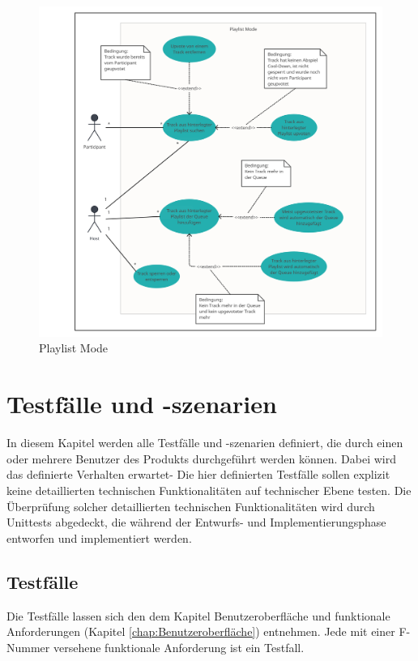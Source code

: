 \documentclass[oneside, ngerman]{sdqtechreport}
\begin{document}
\begin{figure}[h]
    \includegraphics[width = 16cm]{LATEX/Pflichtenheft/GraphicDesigns/Use Case Playlist Mode.png}
    \caption{Playlist Mode}
    \label{fig:Use Case Playlist Mode}
\end{figure}



\chapter{Testfälle und -szenarien}
\label{chap:Tests}

In diesem Kapitel werden alle Testfälle und -szenarien definiert, die durch einen oder mehrere Benutzer des Produkts durchgeführt werden können. Dabei wird das definierte Verhalten erwartet- Die hier definierten Testfälle sollen explizit keine detaillierten technischen Funktionalitäten auf technischer Ebene testen. Die Überprüfung solcher detaillierten technischen Funktionalitäten wird durch Unittests abgedeckt, die während der Entwurfs- und Implementierungsphase entworfen und implementiert werden.

\section{Testfälle}
\label{sec:Tests:Testfälle}

Die Testfälle lassen sich den dem Kapitel Benutzeroberfläche und funktionale Anforderungen (Kapitel \ref{chap:Benutzeroberfläche}) entnehmen. Jede mit einer F-Nummer versehene funktionale Anforderung ist ein Testfall.
\end{document}
